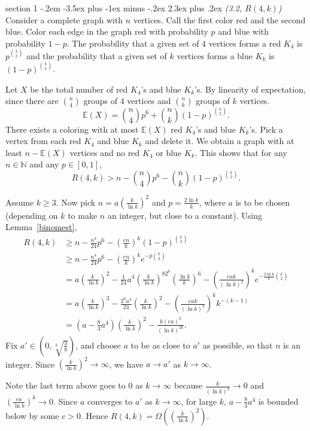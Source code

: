 \documentclass[12pt]{article}
\makeatletter
\theoremstyle{norm}
\newcommand{\E}[0]{\mathbb{E}}
\newcommand{\N}[0]{\mathbb{N}}
\newcommand{\rc}[1]{\frac{1}{#1}}
\newcommand{\Om}[0]{\Omega}
\newcommand{\pa}[1]{\left( {#1} \right)}
\newcommand{\pf}[2]{\pa{\frac{#1}{#2}}}
\newcommand{\iy}[0]{\infty}
\newenvironment{problem}{\@startsection
       {section}
       {1}
       {-.2em}
       {-3.5ex plus -1ex minus -.2ex}
       {2.3ex plus .2ex}
       {\pagebreak[3]%
       \large\bf\noindent{Problem }
       }
       }
       {%
       }
\makeatother
\begin{document}
\begin{problem}{\it (3.2, $R(4,k)$)}
Consider a complete graph with $n$ vertices. Call the first color red and the second blue. Color each edge in the graph red with probability $p$ and blue with probability $1-p$. The probability that a given set of $4$ vertices forms a red $K_4$ is $p^{\binom 42}$ and the probability that a given set of $k$ vertices forms a blue $K_k$ is $(1-p)^{\binom k2}$.

Let $X$ be the total number of red $K_4$'s and blue $K_k$'s.  %
By linearity of expectation, since there are $\binom n4$ groups of $4$ vertices and $\binom nk$ groups of $k$ vertices.
\[
\E(X)= \binom n4 p^{6}+\binom nk(1-p)^{\binom k2}.
\]
There exists a coloring with at most $\E(X)$ red $K_4$'s and blue $K_k$'s. Pick a vertex from each red $K_4$ and blue $K_k$ and delete it. We obtain a graph with at least $n-\E(X)$ vertices and no red $K_4$ or blue $K_k$. This shows that for any $n\in \N$ and any $p\in [0,1]$,
\[
R(4,k)> n- \binom n4 p^{6}-\binom nk(1-p)^{\binom k2}.
\] 

Assume $k\ge 3$. Now pick $n=a\pf{k}{\ln k}^2$ and $p=\frac{2\ln k}{k}$, where $a$ is to be chosen (depending on $k$ to make $n$ an integer, but close to a constant). Using Lemma~\ref{binomest},
\begin{align*}
R(4,k)&
\ge n-\frac{n^4}{24}p^6-\pf{en}{k}^k (1-p)^{\binom k2}\\
&\ge n-\frac{n^4}{24}p^6-\pf{en}{k}^k e^{-p\binom k2}\\
&= a\pf{k}{\ln k}^2 -\rc{24} a^4\pf{k}{\ln k}^82^6\pf{\ln k}{k}^6
- \pf{eak}{(\ln k)^2}^ke^{-\frac{2\ln k}{k}\binom k2}\\
&=a\pf{k}{\ln k}^2-\frac{2^6a^4}{24}\pf k{\ln k}^2 -\pf{eak}{(\ln k)^2}^k k^{-(k-1)}\\
&=\pa{a-\frac{8}{3}a^4}\pf{k}{\ln k}^2-\frac{k(ea)^k}{(\ln k)^{2k}}.
\end{align*}
Fix $a'\in \pa{0,\sqrt[3]{\frac 38}}$, and choose $a$ to be as close to $a'$ as possible, so that $n$ is an integer. Since $\pf{k}{\ln k}^2\to \iy$, we have $a\to a'$ as $k\to \iy$.

Note the last term above goes to 0 as $k\to \iy$ because $\frac{k}{(\ln k)^k}\to 0$ and $\pf{ea}{\ln k}^k\to 0$. %
Since $a$ converges to $a'$ as $k\to \iy$, for large $k$, $a-\frac{8}{3}a^4$ is bounded below by some $c>0$. Hence $R(4,k)=\Om(\pf{k}{\ln k}^2)$.
\end{problem}
\end{document}
